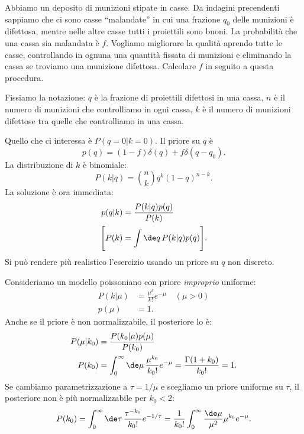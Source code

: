 \begin{exercise}
	Abbiamo un deposito di munizioni stipate in casse.
	Da indagini precendenti sappiamo che ci sono casse ``malandate''
	in cui una frazione $q_0$ delle munizioni è difettosa,
	mentre nelle altre casse tutti i proiettili sono buoni.
	La probabilità che una cassa sia malandata è $f$.
	Vogliamo migliorare la qualità aprendo tutte le casse,
	controllando in ognuna una quantità fissata di munizioni e
	eliminando la cassa se troviamo una munizione difettosa.
	Calcolare $f$ in seguito a questa procedura.
\end{exercise}

\begin{solution}
	Fissiamo la notazione:
	$q$ è la frazione di proiettili difettosi in una cassa,
	$n$ è il numero di munizioni che controlliamo in ogni cassa,
	$k$ è il numero di munizioni difettose tra quelle che controlliamo in una cassa.
	
	Quello che ci interessa è $P(q=0|k=0)$.
	Il priore su $q$ è
	\begin{equation*}
		p(q) = (1-f) \delta(q) + f \delta(q-q_0).
	\end{equation*}
	La distribuzione di $k$ è binomiale:
	\begin{equation*}
		P(k|q) = \binom nk q^k (1-q)^{n-k}.
	\end{equation*}
	La soluzione è ora immediata:
	\begin{align*}
		p(q|k) &= \frac{P(k|q) p(q)}{P(k)} \\
		\Bigg[ P(k) &= \int \de q\, P(k|q) p(q) \Bigg].
	\end{align*}
	Si può rendere più realistico l'esercizio usando un priore su $q$ non discreto.
\end{solution}


\begin{example}
	Consideriamo un modello poissoniano con priore \emph{improprio} uniforme:
	\begin{align*}
		P(k|\mu) &= \frac{\mu^k}{k!}e^{-\mu} \quad (\mu > 0) \\
		p(\mu) &= 1.
	\end{align*}
	Anche se il priore è non normalizzabile, il posteriore lo è:
	\begin{align*}
		P(\mu|k_0) &= \frac{P(k_0|\mu) p(\mu)}{P(k_0)} \\
		P(k_0) &= \int_0^\infty \de\mu\, \frac{\mu^{k_0}}{k_0!}e^{-\mu} = \frac{\Gamma(1+k_0)}{k_0!} = 1.
	\end{align*}
	Se cambiamo parametrizzazione a $\tau=1/\mu$ e scegliamo un priore uniforme su $\tau$,
	il posteriore non è più normalizzabile per $k_0<2$:
	\begin{equation*}
		P(k_0)
		= \int_0^\infty \de\tau\, \frac{\tau^{-k_0}}{k_0!}e^{-1/\tau}
		= \frac1{k_0!} \int_0^\infty \frac{\de\mu}{\mu^2} \mu^{k_0}e^{-\mu}.
	\end{equation*}
\end{example}
